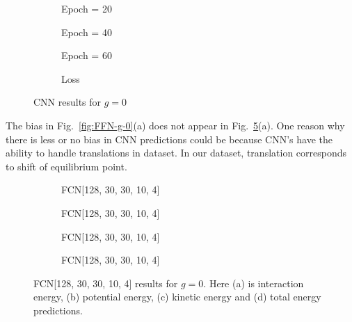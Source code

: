 \documentclass[a4paper,times,12pt]{article}
\begin{document}
\begin{figure}[H]
    \centering
    \begin{subfigure}[t]{0.45\textwidth}
		\centering
        
        \caption{Epoch = 20}
		\label{fig:a}
    \end{subfigure}
    \begin{subfigure}[t]{0.45\textwidth}
		\centering
        
        \caption{Epoch = 40}
		\label{fig:b}
    \end{subfigure}    
    \begin{subfigure}[t]{0.45\textwidth}
        \centering
        
        \caption{Epoch = 60}
		\label{fig:c}
    \end{subfigure}
    \begin{subfigure}[t]{0.45\textwidth}
        \centering
        
        \caption{Loss}
		\label{fig:c}
    \end{subfigure}
    \caption{CNN results for $g = 0$}
\label{fig:CNN-g-0}
\end{figure}

The bias in Fig.~\ref{fig:FFN-g-0}(a) does not appear in Fig.~\ref{fig:CNN-g-0}(a). One reason why there is less or no bias in CNN predictions could be because CNN's have the ability to handle translations in dataset. In our dataset, translation corresponds to shift of equilibrium point. 

\begin{figure}[H]
    \centering
    \begin{subfigure}[t]{0.45\textwidth}
		\centering
        
        \caption{FCN[128, 30, 30, 10, 4]}
		\label{fig:a}
    \end{subfigure}
    \begin{subfigure}[t]{0.45\textwidth}
		\centering
        
        \caption{FCN[128, 30, 30, 10, 4]}
		\label{fig:b}
    \end{subfigure}    
    \begin{subfigure}[t]{0.45\textwidth}
        \centering
        
        \caption{FCN[128, 30, 30, 10, 4]}
		\label{fig:c}
    \end{subfigure}
    \begin{subfigure}[t]{0.45\textwidth}
        \centering
        
        \caption{FCN[128, 30, 30, 10, 4]}
		\label{fig:c}
    \end{subfigure}
	\caption{FCN[128, 30, 30, 10, 4] results for $g = 0$. Here (a) is interaction energy, (b) potential energy, (c) kinetic energy and (d) total energy predictions.}
\label{fig:FFN-g-0-S}
\end{figure}
\end{document}
